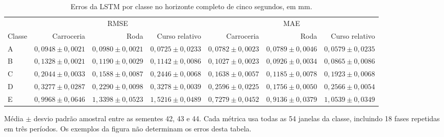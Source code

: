 \begin{table}[t]
\caption{Erros da LSTM por classe no horizonte completo de cinco segundos, em mm.}
\label{tab:class-errors}
\centering\small
\begin{tabular}{lrrrrrr}\toprule
& \multicolumn{3}{c}{RMSE} & \multicolumn{3}{c}{MAE}\\
Classe & Carroceria & Roda & Curso relativo & Carroceria & Roda & Curso relativo\\\midrule
A & $0,0948\pm0,0021$ & $0,0980\pm0,0021$ & $0,0725\pm0,0233$ & $0,0782\pm0,0023$ & $0,0789\pm0,0046$ & $0,0579\pm0,0235$\\
B & $0,1328\pm0,0021$ & $0,1190\pm0,0029$ & $0,1142\pm0,0086$ & $0,1027\pm0,0023$ & $0,0926\pm0,0034$ & $0,0865\pm0,0086$\\
C & $0,2044\pm0,0033$ & $0,1588\pm0,0087$ & $0,2446\pm0,0068$ & $0,1638\pm0,0057$ & $0,1185\pm0,0078$ & $0,1923\pm0,0068$\\
D & $0,3277\pm0,0287$ & $0,2290\pm0,0098$ & $0,3278\pm0,0039$ & $0,2596\pm0,0225$ & $0,1756\pm0,0050$ & $0,2566\pm0,0054$\\
E & $0,9968\pm0,0646$ & $1,3398\pm0,0523$ & $1,5216\pm0,0489$ & $0,7279\pm0,0452$ & $0,9136\pm0,0379$ & $1,0539\pm0,0349$\\
\bottomrule\end{tabular}
\parbox{0.96\textwidth}{\footnotesize Média $\pm$ desvio padrão amostral entre as sementes 42, 43 e 44. Cada métrica usa todas as 54 janelas da classe, incluindo 18 fases repetidas em três períodos. Os exemplos da figura não determinam os erros desta tabela.}
\end{table}
